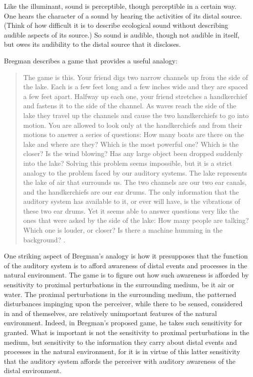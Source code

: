 Like the illuminant, sound is perceptible, though perceptible in a certain way. One hears the character of a sound by hearing the activities of its distal source. (Think of how difficult it is to describe ecological sound without describing audible aspects of its source.) So sound is audible, though not audible in itself, but owes its audibility to the distal source that it discloses.

Bregman describes a game that provides a useful analogy:
\begin{quote}
	The game is this. Your friend digs two narrow channels up from the side of the lake. Each is a few feet long and a few inches wide and they are spaced a few feet apart. Halfway up each one, your friend stretches a handkerchief and fastens it to the side of the channel. As waves reach the side of the lake they travel up the channels and cause the two handkerchiefs to go into motion. You are allowed to look only at the handkerchiefs and from their motions to answer a series of questions: How many boats are there on the lake and where are they? Which is the most powerful one? Which is the closer? Is the wind blowing? Has any large object been dropped suddenly into the lake? Solving this problem seems impossible, but it is a strict analogy to the problem faced by our auditory systems. The lake represents the lake of air that surrounds us. The two channels are our two ear canals, and the handkerchiefs are our ear drums. The only information that the auditory system has available to it, or ever will have, is the vibrations of these two ear drums. Yet it seems able to answer questions very like the ones that were asked by the side of the lake: How many people are talking? Which one is louder, or closer? Is there a machine humming in the background? \citep[5--6]{Bregman:1990aa}.
\end{quote}

One striking aspect of Bregman's analogy is how it presupposes that the function of the auditory system is to afford awareness of distal events and processes in the natural environment. The game is to figure out how such awareness is afforded by sensitivity to proximal perturbations in the surrounding medium, be it air or water. The proximal perturbations in the surrounding medium, the patterned disturbances impinging upon the perceiver, while there to be sensed, considered in and of themselves, are relatively unimportant features of the natural environment. Indeed, in Bregman's proposed game, he takes such sensitivity for granted. What is important is not the sensitivity to proximal perturbations in the medium, but sensitivity to the information they carry about distal events and processes in the natural environment, for it is in virtue of this latter sensitivity that the auditory system affords the perceiver with auditory awareness of the distal environment.

